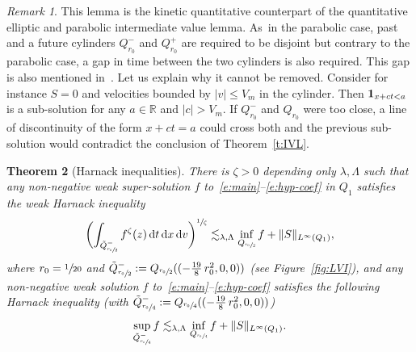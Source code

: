 \documentclass[11pt]{article}
\numberwithin{equation}{section}\let\oldbigcup\bigcup
\newtheorem{theorem}{Theorem}
\theoremstyle{definition}
\theoremstyle{remark}
\newtheorem{remark}[theorem]{Remark}
\newcommand{\dd}{{\, \mathrm d}}
\begin{document}
\begin{remark}
\label{rem:gap}
This lemma is the kinetic quantitative counterpart of the
quantitative elliptic \cite{DG56,DG57,vasseur} and parabolic
\cite{gueDGhalv2} intermediate value lemma. As~in the
parabolic case, past and a future cylinders $Q_{r_0}^{-}$ and
$Q_{r_0}^{+}$ are required to be disjoint but contrary to the
parabolic case, a gap in time between the two cylinders is also
required. This gap is also mentioned in~\cite{gimv,AP20}. Let
us explain why it cannot be removed. Consider for instance
$S=0$ and velocities bounded by $|v| \le V_m$ in the
cylinder. Then ${\bf 1}_{x+ct<a}$ is a sub-solution for any
$a\in \mathbb{R}$ and $|c|>V_m$. If $Q_{r_0}^{-}$ and $Q_{r_0}$
were too close, a line of discontinuity of the form $x+ct=a$
could cross both and the previous sub-solution would contradict
the conclusion of Theorem~\ref{t:IVL}.
\end{remark}

\begin{theorem}[Harnack inequalities]
\label{t:harnack}
There is $\zeta >0$ depending only $\lambda,\Lambda$ such that
any non-negative weak super-solution $f$
to~\eqref{e:main}--\eqref{e:hyp-coef} in $Q_1$ satisfies the
weak Harnack inequality\vspace*{-3pt}
\begin{equation}
\label{eq:w-Harnack-stat}
\biggl( \int_{\tilde Q_{\sfrac{r_0}{2}}^-} f^\zeta (z) \dd t \dd x \dd v
\biggr)^{\sfrac{1}{\zeta}}
\lesssim_{\lambda,\Lambda} \inf_{ Q_{\sfrac{r_0}{2}}}f
+ \|S\|_{L^\infty (Q_1)},
\end{equation}
where $r_0=\sfrac{1}{20}$ and
$\tilde Q_{\sfrac{r_0}{2}}
^{-}:=Q_{\sfrac{r_0}{2}}((-\frac{19}{8}\,r_0^2,0,0))$ (see
Figure~\ref{fig:LVI}), and any non-negative weak solution $f$
to~\eqref{e:main}--\eqref{e:hyp-coef} satisfies the following
Harnack inequality (with
$\tilde
Q_{\sfrac{r_0}{4}}^{-}:=Q_{\sfrac{r_0}{4}}((-\frac{19}{8}\,r_0^2,0,0))$)\vspace*{-3pt}
\begin{equation}
\label{eq:s-Harnack-stat}
\sup_{\tilde Q_{\sfrac{r_0}{4}}^{-}} f \lesssim_{\lambda,\Lambda}
\inf_{Q_{\sfrac{r_0}{4}}} f + \| S \|_{L^\infty(Q_1)}.
\end{equation}
\end{theorem}
\end{document}
